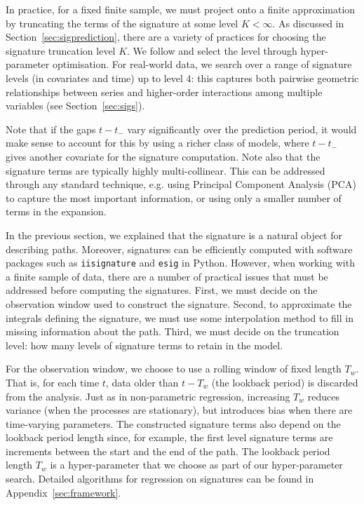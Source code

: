\documentclass[a4paper, 12pt]{article}
\theoremstyle{remark}
\begin{document}
In practice, for a fixed finite sample, we must project onto a finite approximation by truncating the terms of the signature at some level $K<\infty$. As discussed in Section~\ref{sec:sigprediction}, there are a variety of practices for choosing the signature truncation level \(K\). We follow \cite{morrill2021neuralrough} and select the level through hyper-parameter optimisation. For real-world data, we search over a range of signature levels (in covariates and time) up to level $4$: this captures both pairwise geometric relationships between series and higher-order interactions among multiple variables (see Section~\ref{sec:sigs}).

Note that if the gaps \(t-t_-\) vary significantly over the prediction period, it would make sense to account for this by using a richer class of models, where \(t-t_-\) gives another covariate for the signature computation.
Note also that the signature terms are typically highly multi-collinear. This can be addressed through any standard technique, e.g. using Principal Component Analysis (PCA) to capture the most important information, or using only a smaller number of terms in the expansion.

In the previous section, we explained that the signature is a natural object for describing paths. Moreover, signatures can be efficiently computed with software packages such as \texttt{iisignature} \citep{iisignature} and \texttt{esig} in Python. However, when working with a finite sample of data, there are a number of practical issues that must be addressed before computing the signatures. First, we must decide on the observation window used to construct the signature. Second, to approximate the integrals defining the signature, we must use some interpolation method to fill in missing information about the path. Third, we must decide on the truncation level: how many levels of signature terms to retain in the model.

For the observation window, we choose to use a rolling window of fixed length $T_w$. That is, for each time $t$, data older than $t-T_w$ (the lookback period) is discarded from the analysis. Just as in non-parametric regression, increasing $T_w$ reduces variance (when the processes are stationary), but introduces bias when there are time-varying parameters. The constructed signature terms also depend on the lookback period length since, for example, the first level signature terms are increments between the start and the end of the path. The lookback period length $T_w$ is a hyper-parameter that we choose as part of our hyper-parameter search. Detailed algorithms for regression on signatures can be found in Appendix~\ref{sec:framework}.
\end{document}
